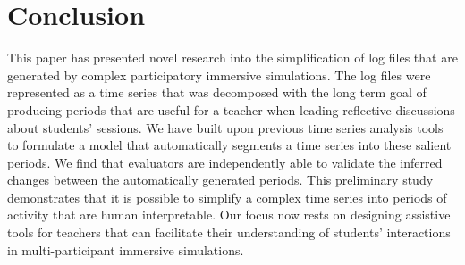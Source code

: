 \section{Conclusion}

This paper has presented novel research into the simplification of log files that are generated by complex participatory immersive simulations. The log files were represented as a time series that was decomposed with the long term goal of producing periods that are useful for a teacher when leading reflective discussions about students' sessions. We have built upon previous time series analysis tools to formulate a model that automatically segments a time series into these salient periods. We find that evaluators are independently able to validate the inferred changes between the automatically generated periods. This preliminary study demonstrates that it is possible to simplify a complex time series into periods of activity that are human interpretable.  Our focus now rests on designing assistive tools for teachers that can facilitate their understanding of students' interactions in multi-participant immersive simulations.
